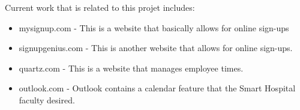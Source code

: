 \begin{flushleft}
Current work that is related to this projet includes: 
\end{flushleft}
\begin{itemize}
	\item mysignup.com - This is a website that basically allows for online sign-ups 
	\item signupgenius.com - This is another website that allows for online sign-ups.
	\item quartz.com - This is a website that manages employee times. 
	\item outlook.com - Outlook contains a calendar feature that the Smart Hospital faculty desired. 
\end{itemize}

